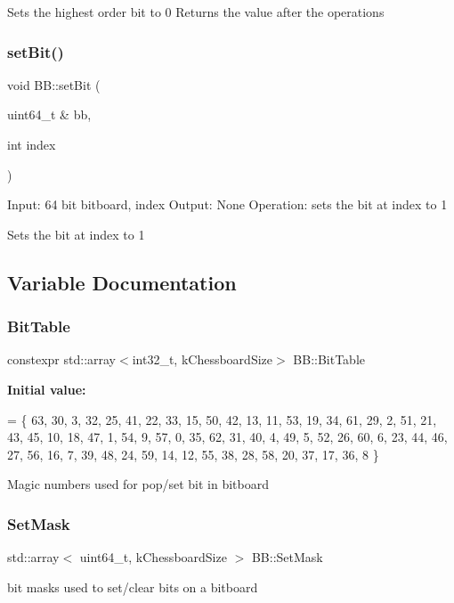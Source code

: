 Sets the highest order bit to 0 Returns the value after the operations \mbox{\label{namespaceBB_aaf574afbd59d42b7ffc4acc32837d2f4}} 
\subsubsection{\texorpdfstring{set\+Bit()}{setBit()}}
{\footnotesize\ttfamily void B\+B\+::set\+Bit (\begin{DoxyParamCaption}\item[{uint64\+\_\+t \&}]{bb,  }\item[{int}]{index }\end{DoxyParamCaption})\hspace{0.3cm}{\ttfamily [noexcept]}}

Input\+: 64 bit bitboard, index Output\+: None Operation\+: sets the bit at index to 1

Sets the bit at index to 1 

\subsection{Variable Documentation}
\mbox{\label{namespaceBB_a0acc37f2676f5477b3ae05b694d6de80}} 
\subsubsection{\texorpdfstring{Bit\+Table}{BitTable}}
{\footnotesize\ttfamily constexpr std\+::array$<$int32\+\_\+t, k\+Chessboard\+Size$>$ B\+B\+::\+Bit\+Table}

{\bfseries Initial value\+:}
\begin{DoxyCode}
= \{
      63, 30, 3, 32, 25, 41, 22, 33, 15, 50, 42, 13, 11, 53, 19, 34, 61, 29, 2,
      51, 21, 43, 45, 10, 18, 47, 1, 54, 9, 57, 0, 35, 62, 31, 40, 4, 49, 5, 52,
      26, 60, 6, 23, 44, 46, 27, 56, 16, 7, 39, 48, 24, 59, 14, 12, 55, 38, 28,
      58, 20, 37, 17, 36, 8
    \}
\end{DoxyCode}
Magic numbers used for pop/set bit in bitboard \mbox{\label{namespaceBB_a10499bbea66c7e9162798c25c7f956e1}} 
\subsubsection{\texorpdfstring{Set\+Mask}{SetMask}}
{\footnotesize\ttfamily std\+::array$<$ uint64\+\_\+t, k\+Chessboard\+Size $>$ B\+B\+::\+Set\+Mask}

bit masks used to set/clear bits on a bitboard 